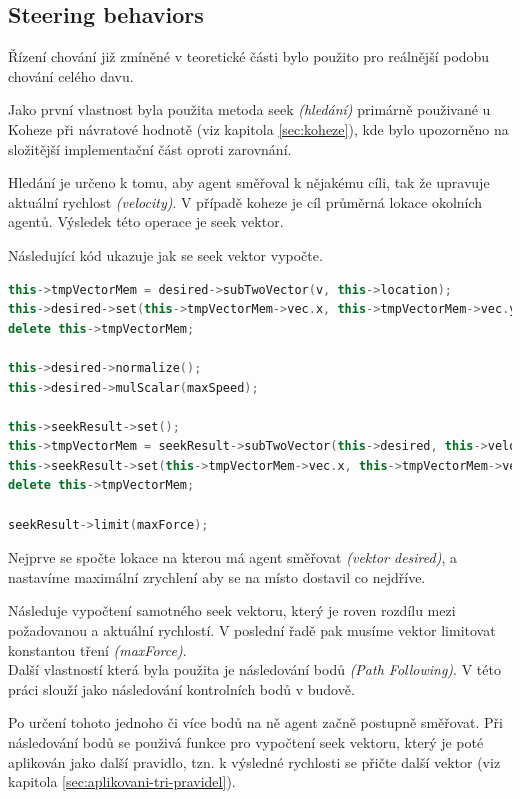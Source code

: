 \documentclass[czech,public,dept460,male,cpdeclaration]{diploma}
\begin{document}
\subsection{Steering behaviors}\label{sec:steering-behaviors}
Řízení chování \cite{linkToSteeringBehaviors} již zmíněné v teoretické části bylo použito pro reálnější podobu chování celého davu.

Jako první vlastnost byla použita metoda seek \textit{(hledání)} primárně použivané u Koheze při návratové hodnotě (viz kapitola \ref{sec:koheze}), kde bylo upozorněno na složitější implementační část oproti zarovnání.

Hledání je určeno k tomu, aby agent směřoval k nějakému cíli, tak že upravuje aktuální rychlost \textit{(velocity)}. V případě koheze je cíl průměrná lokace okolních agentů. Výsledek této operace je seek vektor.

Následující kód ukazuje jak se seek vektor vypočte.

\begin{lstlisting}[language=c++,label=src:seek,caption=Vypočtení seek vektoru]
this->tmpVectorMem = desired->subTwoVector(v, this->location);
this->desired->set(this->tmpVectorMem->vec.x, this->tmpVectorMem->vec.y, this->tmpVectorMem->vec.z);
delete this->tmpVectorMem;

this->desired->normalize();
this->desired->mulScalar(maxSpeed);

this->seekResult->set();
this->tmpVectorMem = seekResult->subTwoVector(this->desired, this->velocity);
this->seekResult->set(this->tmpVectorMem->vec.x, this->tmpVectorMem->vec.y, this->tmpVectorMem->vec.z);
delete this->tmpVectorMem;

seekResult->limit(maxForce);
\end{lstlisting}

Nejprve se spočte lokace na kterou má agent směřovat \textit{(vektor desired)}, a nastavíme maximální zrychlení aby se na místo dostavil co nejdříve.

Následuje vypočtení samotného seek vektoru, který je roven rozdílu mezi požadovanou a aktuální rychlostí. V poslední řadě pak musíme vektor limitovat konstantou tření \textit{(maxForce)}.
\\

Další vlastností která byla použita je následování bodů \textit{(Path Following)}. V této práci slouží jako následování kontrolních bodů v budově.

Po určení tohoto jednoho či více bodů na ně agent začně postupně směřovat. Při následování bodů se použivá funkce pro vypočtení seek vektoru, který je poté aplikován jako další pravidlo, tzn. k výsledné rychlosti se přičte další vektor (viz kapitola \ref{sec:aplikovani-tri-pravidel}).
\end{document}
